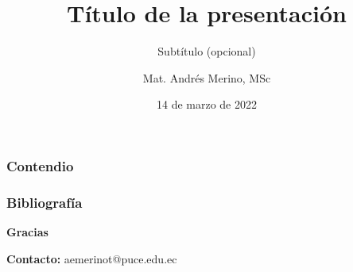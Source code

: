 \documentclass[aspectratio=169]{beamer}
\title{Título de la presentación}
\subtitle{Subtítulo (opcional)}
\author{Mat. Andrés Merino, MSc}
\institute{Carrera de Ciencia de Datos}
\date{14 de marzo de 2022}
\begin{document}
\begin{frame}[plain]
\addtocounter{framenumber}{-1}
    \titlepage
\end{frame}

\begin{frame}[plain]
    \frametitle{Contendio}
    \vspace*{-15mm}

    \tableofcontents
\end{frame}





\begin{frame}[t]    
    \frametitle{Bibliografía}
    \vspace{-16mm}
    \nocite{*}
    \printbibliography
\end{frame}


\begin{frame}[plain]
\begin{center}
    \color{white}
    {\Huge\textbf{Gracias}}

    \vspace{1cm}
    \textcolor{azul}{\textbf{Contacto:}} aemerinot@puce.edu.ec
\end{center}
\end{frame}
\end{document}
